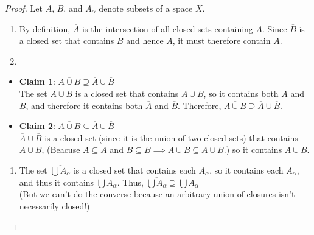 \documentclass[
]{book}
\providecommand{\tightlist}{%
  \setlength{\itemsep}{0pt}\setlength{\parskip}{0pt}}
\theoremstyle{definition}
\theoremstyle{definition}
\theoremstyle{definition}
\theoremstyle{definition}
\theoremstyle{remark}
\begin{document}
\begin{proof}

Let \(A\), \(B\), and \(A_{\alpha}\) denote subsets of a space \(X\).

\begin{enumerate}
\def\labelenumi{(\alph{enumi})}
\item
  By definition, \(\overline{A}\) is the intersection of all closed sets containing \(A\). Since \(\overline{B}\) is a closed set that contains \(B\) and hence \(A\), it must therefore contain \(\overline{A}\).
\item
\end{enumerate}

\begin{itemize}
\item
  \textbf{Claim 1}: \(\overline{A \cup B} \supseteq {\overline{A}} \cup {\overline{B}}\)\\
  The set \(\overline{A \cup B}\) is a closed set that contains \(A \cup B\), so it contains both \(A\) and \(B\),
  and therefore it contains both \(\overline{A}\) and \(\overline{B}\). Therefore, \(\overline{A \cup B} \supseteq {\overline{A}} \cup {\overline{B}}\).
\item
  \textbf{Claim 2}: \(\overline{A \cup B} \subseteq {\overline{A}} \cup {\overline{B}}\)\\
  \({\overline{A}} \cup \overline{B}\) is a closed set (since it is the union of two closed sets) that
  contains \(A \cup B\), (Beacuse \(A\subseteq\overline{A}\) and \(B \subseteq \overline{B}\implies A \cup B \subseteq \overline{A} \cup \overline{B}\).) so it contains \(\overline{A \cup B}\).
\end{itemize}

\begin{enumerate}
\def\labelenumi{(\alph{enumi})}
\setcounter{enumi}{2}
\tightlist
\item
  The set \(\overline{\bigcup A_{\alpha}}\) is a closed set that contains each \(A_{\alpha}\), so it contains each \(\overline{A_{\alpha}}\), and thus it contains \(\bigcup \overline{A_{\alpha}}\). Thus, \(\overline{\bigcup A_{\alpha}} \supseteq \bigcup \overline{A_{\alpha}}\)\\
  (But we can't do the converse because an arbitrary union of closures isn't necessarily closed!)\\
\end{enumerate}


\end{proof}
\end{document}
